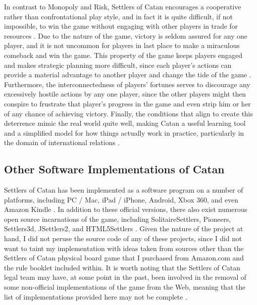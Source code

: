 \documentclass[pageno]{jpaper}
\begin{document}
\begin{doublespacing}
In contrast to Monopoly and Risk, Settlers of Catan encourages a cooperative rather than confrontational play style, and in fact it is quite difficult, if not impossible, to win the game without engaging with other players in trade for resources \cite{eskin2010,wingrove2011}. Due to the nature of the game, victory is seldom assured for any one player, and it is not uncommon for players in last place to make a miraculous comeback and win the game. This property of the game keeps players engaged and makes strategic planning more difficult, since each player's actions can provide a material advantage to another player and change the tide of the game \cite{eskin2010}. Furthermore, the interconnectedness of players' fortunes serves to discourage any excessively hostile actions by any one player, since the other players might then conspire to frustrate that player's progress in the game and even strip him or her of any chance of achieving victory. Finally, the conditions that align to create this deterrence mimic the real world quite well, making Catan a useful learning tool and a simplified model for how things actually work in practice, particularly in the domain of international relations \cite{eskin2010}. 

\hypertarget{sec:other_software_implementations_of_catan}{}
\subsection{Other Software Implementations of Catan}

Settlers of Catan has been implemented as a software program on a number of platforms, including PC / Mac, iPad / iPhone, Android, Xbox 360, and even Amazon Kindle \cite{catanwebgames}. In addition to these official versions, there also exist numerous open source incarnations of the game, including SolitaireSettlers, Pioneers, Settlers3d, JSettlers2, and HTML5Settlers \cite{clobusetal,detoni,fugate,maddock,monin}. Given the nature of the project at hand, I did not peruse the source code of any of these projects, since I did not want to taint my implementation with ideas taken from sources other than the Settlers of Catan physical board game that I purchased from Amazon.com and the rule booklet included within. It is worth noting that the Settlers of Catan legal team may have, at some point in the past, been involved in the removal of some non-official implementations of the game from the Web, meaning that the list of implementations provided here may not be complete \cite{masnick2011}.


\end{doublespacing}
\end{document}

